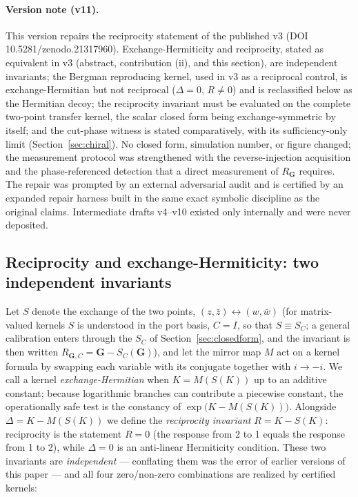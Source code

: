 \documentclass[11pt,a4paper]{article}
\newcommand{\zb}{\bar{z}}
\newcommand{\wb}{\bar{w}}
\begin{document}
\paragraph{Version note (v11).} This version repairs the reciprocity statement
of the published v3 (DOI 10.5281/zenodo.21317960). Exchange-Hermiticity and
reciprocity, stated as equivalent in v3 (abstract, contribution (ii), and this
section), are independent invariants; the Bergman reproducing kernel, used in
v3 as a reciprocal control, is exchange-Hermitian but not reciprocal
($\Delta = 0$, $R \neq 0$) and is reclassified below as the Hermitian decoy;
the reciprocity invariant must be evaluated on the complete two-point transfer
kernel, the scalar closed form being exchange-symmetric by itself; and the
cut-phase witness is stated comparatively, with its sufficiency-only limit
(Section~\ref{sec:chiral}). No closed form, simulation number, or figure
changed; the measurement protocol was strengthened with the
reverse-injection acquisition and the phase-referenced detection that a
direct measurement of $R_{\mathbf{G}}$ requires. The repair was prompted by an external adversarial audit and
is certified by an expanded repair harness built in the same exact symbolic
discipline as the original claims. Intermediate drafts v4--v10 existed only
internally and were never deposited.

\subsection{Reciprocity and exchange-Hermiticity: two independent invariants}
\label{sec:mirror}

Let $S$ denote the exchange of the two points, $(z, \zb) \leftrightarrow (w, \wb)$
(for matrix-valued kernels $S$ is understood in the port basis, $C = I$, so
that $S \equiv S_C$; a general calibration enters through the $S_C$ of
Section~\ref{sec:closedform}, and the invariant is then written
$R_{\mathbf{G},C} = \mathbf{G} - S_C(\mathbf{G})$),
and let the mirror map $M$ act on a kernel formula by swapping each variable with
its conjugate together with $i \to -i$. We call a kernel
\emph{exchange-Hermitian} when $K = M(S(K))$ up to an additive constant; because
logarithmic branches can contribute a piecewise constant, the operationally safe
test is the constancy of $\exp\!\bigl(K - M(S(K))\bigr)$. Alongside
$\Delta = K - M(S(K))$ we define the \emph{reciprocity invariant}
$R = K - S(K)$: reciprocity is the statement $R = 0$ (the response from 2 to 1
equals the response from 1 to 2), while $\Delta = 0$ is an anti-linear
Hermiticity condition. These two invariants are \emph{independent} ---
conflating them was the error of earlier versions of this paper --- and all
four zero/non-zero combinations are realized by certified kernels:
\end{document}
